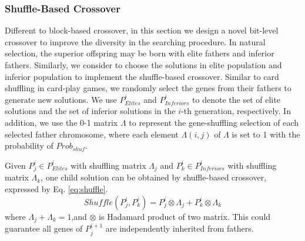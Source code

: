 \documentclass[lettersize,journal]{IEEEtran}
\begin{document}
	
	
	\subsubsection{Shuffle-Based Crossover}
	Different to block-based crossover, in this section we design a novel bit-level crossover to improve the diversity in the searching procedure. In natural selection, the superior offspring may be born with elite fathers and inferior fathers. Similarly, we consider to choose the solutions in elite population and inferior population to implement the shuffle-based crossover. Similar to card shuffling in card-play games, we randomly select the genes from their fathers to generate new solutions. We use $P^i_{Elites}$ and $P^i_{Inferiors}$ to denote the set of elite solutions and the set of inferior solutions in the $i$-th generation, respectively. In addition, we use the 0-1 matrix $\Lambda$ to represent the gene-shuffling selection of each selected father chromosome, where each element $\Lambda (i,j)$ of $\Lambda$  is set to 1 with the probability of $Prob_{shuf}$.
	
	
	
	Given $P^i_j \in P^i_{Elites}$ with shuffling matrix $\Lambda_j$ and $P^i_k \in P^i_{Inferiors}$ with shuffling matrix $\Lambda_k$, one child solution can be obtained by shuffle-based crossover, expressed by Eq. \ref{eq:shuffle}. 
	\begin{equation}
		Shuffle(P^i_j, P^i_k) = P^i_j \otimes \Lambda_j + P^i_k \otimes \Lambda_k
		\label{eq:shuffle}
	\end{equation}
	where $\Lambda_j + \Lambda_k = 1$,and  $\otimes$ is Hadamard product of two matrix. This could guarantee all genes of $P^{i+1}_j$ are independently inherited from fathers.
	
	
	
\end{document}
